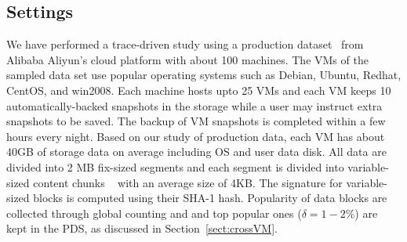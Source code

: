 \subsection{Settings}
We have performed a trace-driven study using a production dataset~\cite{WeiZhangIEEE} from 
Alibaba Aliyun's cloud platform with about 100 machines. 
The VMs  of the sampled  data set   use popular operating systems such as 
Debian, Ubuntu, Redhat, CentOS, and win2008. 
Each machine hosts upto 25 VMs and each VM keeps 10 automatically-backed snapshots in the storage while
a user may instruct extra snapshots to be saved.
The backup of VM snapshots is completed within a few  hours every night.
Based on our study of production  data,  each VM has about  40GB of storage  data  on average
including OS and user data disk.
All data are divided into 2 MB fix-sized segments and each segment is divided into 
variable-sized content chunks ~\cite{similar94,rabin81} with an average size of 4KB.
The signature for variable-sized blocks is computed using their SHA-1 hash. 
Popularity of data blocks are collected through global counting and 
and top popular ones ($\delta=1-2\%$)  are  kept in the PDS, as discussed in Section~\ref{sect:crossVM}.



